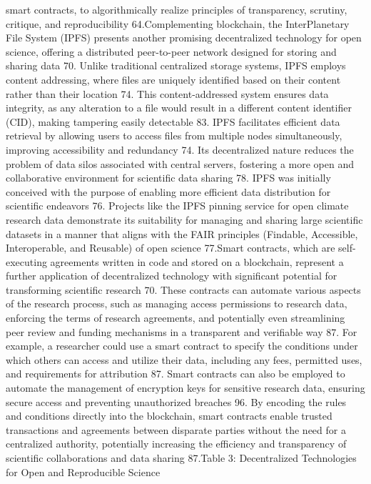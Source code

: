 \documentclass{article}
\begin{document}
smart contracts, to algorithmically realize principles of transparency, scrutiny, critique, and reproducibility 64.Complementing blockchain, the InterPlanetary File System (IPFS) presents another promising decentralized technology for open science, offering a distributed peer-to-peer network designed for storing and sharing data 70. Unlike traditional centralized storage systems, IPFS employs content addressing, where files are uniquely identified based on their content rather than their location 74. This content-addressed system ensures data integrity, as any alteration to a file would result in a different content identifier (CID), making tampering easily detectable 83. IPFS facilitates efficient data retrieval by allowing users to access files from multiple nodes simultaneously, improving accessibility and redundancy 74. Its decentralized nature reduces the problem of data silos associated with central servers, fostering a more open and collaborative environment for scientific data sharing 78. IPFS was initially conceived with the purpose of enabling more efficient data distribution for scientific endeavors 76. Projects like the IPFS pinning service for open climate research data demonstrate its suitability for managing and sharing large scientific datasets in a manner that aligns with the FAIR principles (Findable, Accessible, Interoperable, and Reusable) of open science 77.Smart contracts, which are self-executing agreements written in code and stored on a blockchain, represent a further application of decentralized technology with significant potential for transforming scientific research 70. These contracts can automate various aspects of the research process, such as managing access permissions to research data, enforcing the terms of research agreements, and potentially even streamlining peer review and funding mechanisms in a transparent and verifiable way 87. For example, a researcher could use a smart contract to specify the conditions under which others can access and utilize their data, including any fees, permitted uses, and requirements for attribution 87. Smart contracts can also be employed to automate the management of encryption keys for sensitive research data, ensuring secure access and preventing unauthorized breaches 96. By encoding the rules and conditions directly into the blockchain, smart contracts enable trusted transactions and agreements between disparate parties without the need for a centralized authority, potentially increasing the efficiency and transparency of scientific collaborations and data sharing 87.Table 3: Decentralized Technologies for Open and Reproducible Science
\end{document}
